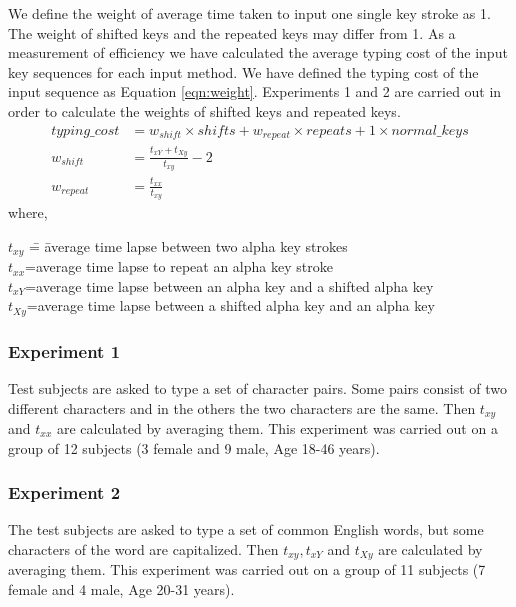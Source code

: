 \documentclass[english]{jnlp_1.3e}
\begin{document}
We define the weight of average time taken to input one single key stroke as 1. The weight of shifted keys and the repeated keys may differ from 1. As a measurement of efficiency we have calculated the average typing cost of the input key sequences for each input method. We have defined the typing cost of the input sequence as  Equation \ref{eqn:weight}. 
 Experiments 1 and 2  are carried out in order to calculate the weights of shifted keys and repeated keys.
\begin{align}
 \mathit{typing\_cost}&=w_{\mathit{shift}}\times \mathit{shifts}+w_{\mathit{repeat}}\times \mathit{repeats}+1\times \mathit{normal\_keys} \label{eqn:weight}\\
 w_{\mathit{shift}}&=\frac{t_{xY}+t_{Xy}}{t_{xy}}-2\\
w_{\mathit{repeat}}&=\frac{t_{xx}}{t_{xy}}
\end{align}
where,
\begin{tabbing}
$t_{xy}$ \= = \=average time lapse between two alpha key strokes\\
$t_{xx}$\>=\>average time lapse to repeat an alpha key stroke\\
$t_{xY}$\>=\>average time lapse between an alpha key and a shifted alpha key\\
$t_{Xy}$\>=\>average time lapse between a shifted alpha key and an alpha key
\end{tabbing}


    \subsubsection*{Experiment 1} 
Test subjects are asked to type a set of character pairs. Some pairs consist of two different characters and in the others the two characters are the same. 
Then $t_{xy}$ and $t_{xx}$ are calculated by averaging them. This experiment was carried out on a group of 12 subjects (3 female and 9 male, Age 18-46 years).

    \subsubsection*{Experiment 2}
The test subjects are asked to type a set of common English words, but some characters of the word are capitalized. 
Then $t_{xy},t_{xY}$ and $t_{Xy}$ are calculated by averaging them.
This experiment was carried out on a group of 11 subjects (7 female and 4 male, Age 20-31 years).
\end{document}
